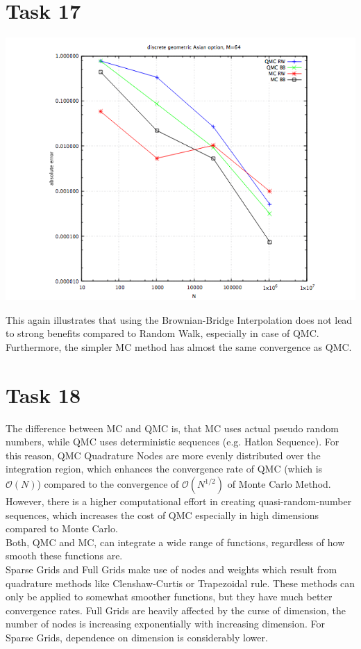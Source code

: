 \documentclass[10pt,a4paper]{article}
\begin{document}
\section*{Task 17}
\begin{center}
\includegraphics[scale=0.51]{task17.png}
\end{center}
This again illustrates that using the Brownian-Bridge Interpolation does not lead to strong benefits compared to Random Walk, especially in case of QMC. Furthermore, the simpler MC method has almost the same convergence as QMC.

\section*{Task 18}

The difference between MC and QMC is, that MC uses actual pseudo random numbers, while QMC uses deterministic sequences (e.g. Hatlon Sequence). For this reason, QMC Quadrature Nodes are more evenly distributed over the integration region, which enhances the convergence rate of QMC (which is $\mathcal{O}(N)$) compared to the convergence of $\mathcal{O}(N^{1/2})$ of Monte Carlo Method. However, there is a higher computational effort in creating quasi-random-number sequences, which increases the cost of QMC especially in high dimensions compared to Monte Carlo. \\

Both, QMC and MC, can integrate a wide range of functions, regardless of how smooth these functions are. \\

Sparse Grids and Full Grids make use of nodes and weights which result from quadrature methods like Clenshaw-Curtis or Trapezoidal rule. These methods can only be applied to somewhat smoother functions, but they have much better convergence rates. 
Full Grids are heavily affected by the curse of dimension, the number of nodes is increasing exponentially with increasing dimension. For Sparse Grids, dependence on dimension is considerably lower. \\
\end{document}
